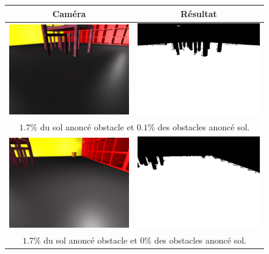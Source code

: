 \documentclass{article}
\begin{document}
\begin{figure}
    \begin{center}
        \begin{tabular}{|cc|}
            \hline
            \textbf{Caméra} & \textbf{Résultat} \\
            \hline
            \includegraphics[width=0.4\linewidth]{rcs/abodv0s.png} & \includegraphics[width=0.4\linewidth]{rcs/abodv0r.png} \\
            \multicolumn{2}{|c|}{$1.7\%$ du sol anoncé obstacle et $0.1\%$ des obstacles anoncé sol.} \\
            \hline
            \includegraphics[width=0.4\linewidth]{rcs/abodv1s.png} & \includegraphics[width=0.4\linewidth]{rcs/abodv1r.png} \\
            \multicolumn{2}{|c|}{$1.7\%$ du sol anoncé obstacle et $0\%$ des obstacles anoncé sol.} \\

\end{tabular}
\end{center}
\end{figure}
\end{document}
